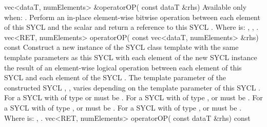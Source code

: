   \addRowTwoL
  {vec<dataT, numElements> \&operatorOP(}
  {  const dataT \&rhs)}
  {
    Available only when: .
    \newline
    Perform an in-place element-wise  bitwise operation between each element of this SYCL  and the  scalar and return a reference to this SYCL .
    \newline \newline
    Where  is: \codeinline{\&=}, \codeinline{\|=}, \codeinline{\^=}. 
  }
  \addRowTwoL
  {vec<RET, numElements> operatorOP(}
  {  const vec<dataT, numElements> \&rhs) const}
  {
    Construct a new instance of the SYCL  class template with the same template parameters as this SYCL  with each element of the new SYCL  instance the result of an element-wise  logical operation between each element of this SYCL  and each element of the  SYCL .
    \newline \newline
    The  template parameter of the constructed SYCL , , varies depending on the  template parameter of this SYCL . For a SYCL  with  of type  or   must be . For a SYCL  with  of type ,  or   must be . For a SYCL  with  of type ,  or   must be . For a SYCL  with  of type ,  or   must be .
    \newline \newline
    Where  is: \codeinline{\&\&}, \codeinline{\|\|}.
  }
  \addRowTwoL
  {vec<RET, numElements> operatorOP(}
  {  const dataT \&rhs) const}
